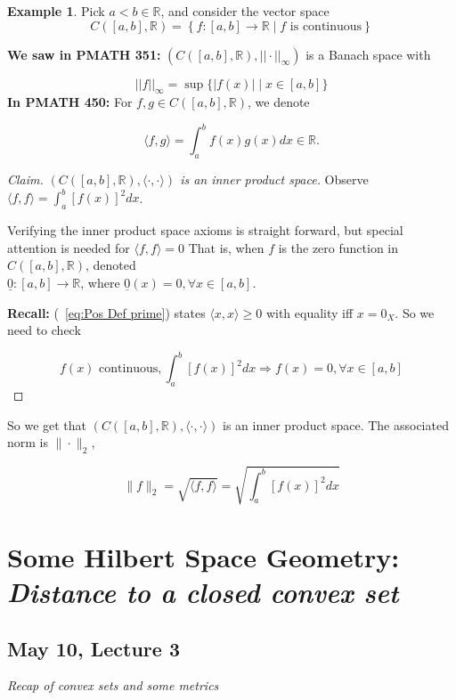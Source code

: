 \documentclass[11pt]{amsart}
\theoremstyle{definition}
\newtheorem{example}[theorem]{Example}
\numberwithin{equation}{section}
\newcommand{\bR}{ \mathbb{R} }	%
\newcommand{\nextgen}{ C\left( [a,b], \bR\right) }				%
\begin{document}
\begin{example}\label{ex:18} Pick $a < b \in \bR$, and consider the vector space $$\nextgen = \left\{ f:[a,b]\rightarrow\bR \; | \; f \mbox{ is continuous} 	\right\}$$ 

\textbf{We saw in PMATH 351:} $\left( \nextgen, ||\cdot ||_{\infty} \right)$ is a Banach space with 

\[\label{eq:Sup-Norm} \tag{Sup-Norm} ||f||_{\infty} = \sup \{ |f(x)| \; | \; x\in [a,b]	\} \]
\newpage 
\textbf{In PMATH 450:} For $f,g \in \nextgen$, we denote 

$$\langle f,g \rangle = \int_a^b f(x)g(x)dx \in \bR.$$

\begin{proof}[Claim] \textit{$\left(\nextgen, \langle \cdot, \cdot \rangle	\right)$ is an inner product space.}
Observe $\langle f, f\rangle = \int_a^b [f(x)]^2 dx$. 

Verifying the inner product space axioms is straight forward, but special attention is needed for $\langle f, f \rangle = 0$ That is, when $f$ is the zero function in $\nextgen$, denoted \\ $\underline 0: [a,b] \rightarrow \bR$, where $\underline 0 (x) = 0, \forall x \in [a,b]$.

\textbf{Recall:} (~\ref{eq:Pos Def prime}) states $\langle x, x \rangle \ge 0$ with equality iff $x = 0_X$. So we need to check 

$$ f(x) \mbox{ continuous}, \int_a^b [f(x)]^2 dx \Rightarrow f(x) = 0, \forall x \in [a,b] $$
\end{proof}

So we get that $\left( \nextgen, \langle \cdot, \cdot \rangle \right)$ is an inner product space. The associated norm is $\| \cdot \|_2$, 

$$ \| f \|_2 = \sqrt{ \langle f , f \rangle } = \sqrt{\int_a^b [f(x)]^2dx}$$

\end{example}

\vspace{10pt}

\section{Some Hilbert Space Geometry: \textit{Distance to a closed convex set}}

\vspace{6pt}

\subsection{May 10, Lecture 3} \textit{Recap of convex sets and some metrics}
\end{document}
